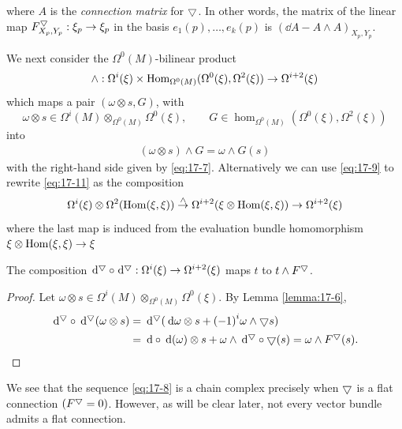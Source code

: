 where $A$ is the \textit{connection matrix} for $\bigtriangledown$. In other words, the matrix of the linear 
map ${F}_{X_{p},{Y}_{p}}^\bigtriangledown:{\xi }_{p} \rightarrow  {\xi }_{p}$ in the 
basis ${e}_1(p),\ldots,{e}_{k}(p)$ is ${(\!\dd A- A \land  A) }_{X_{p},{Y}_{p}}$.

We next consider the $\Omega^0(M)$-bilinear product
\[
  \land:\Omega^{i}(\xi)  \times  {\operatorname{Hom}}_{\Omega^0(M) }( {\Omega^0(\xi),\Omega^{2}(\xi) })  \rightarrow  \Omega^{i + 2}(\xi)
\]
which maps a pair $( {\omega  \otimes  s,G})$, with
\[
  \omega  \otimes  s \in  \Omega^{i}(M) \otimes_{\Omega^0(M) }\Omega^0(\xi),\qquad
  G \in  {\hom}_{\Omega^0(M) }( {\Omega^0(\xi),\Omega^{2}(\xi) })
\]
into
\begin{align}\label{eq:17-11}
  ( {\omega  \otimes  s})  \land  G = \omega  \land  G(s)
\end{align}
with the right-hand side given by \eqref{eq:17-7}. Alternatively we can use \eqref{eq:17-9} to rewrite \eqref{eq:17-11} 
as the composition
\[
  \Omega^{i}(\xi)  \otimes  \Omega^{2}( \operatorname{Hom}(\xi, \xi)) 
  \overset{ \land  }{ \rightarrow  }
  \Omega^{i + 2}( {\xi  \otimes  \operatorname{Hom}(\xi, \xi) })  \rightarrow  \Omega^{i + 2}(\xi)
\]
where the last map is induced from the evaluation bundle homomorphism $\xi  \otimes  \operatorname{Hom}(\xi, \xi)  \rightarrow  \xi$

\begin{lemma}\label{lemma:17-8}
  The composition $\dd^\btd \circ  \dd^\btd:\Omega^{i}(\xi)  \ra \Omega^{i + 2}(\xi)$ 
  maps $t$ to $t \land  {F}^\bigtriangledown$.
\end{lemma}

\begin{proof}
  Let $\omega  \otimes  s \in  \Omega^{i}(M) \otimes_{\Omega^0(M) }\Omega^0(\xi)$. By Lemma \ref{lemma:17-6},
  \begin{align*}
    \dd^\btd \circ  \dd^\btd( {\omega  \otimes  s})  
    & = \dd^\btd( {{\dd\omega } \otimes  s + {(-1) }^{i}\omega  \land  \btd s}) \\
    & = \dd \circ  \dd( \omega )  \otimes  s + \omega  \land  \dd^\btd \circ  \btd (s)  
      = \omega  \land  {F}^\btd(s).
  \end{align*}
\end{proof}

We see that the sequence \eqref{eq:17-8} is a chain complex precisely when $\bigtriangledown$ is a flat 
connection $( {{F}^\bigtriangledown = 0})$. However, as will be clear later, not every vector bundle 
admits a flat connection.


